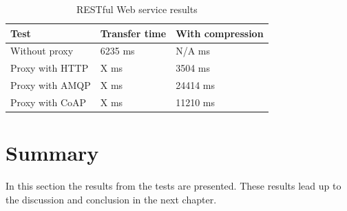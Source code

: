 \begin{table}[h!]
\begin{tabular}{| l | l | l |}
\hline
  \textbf{Test} & \textbf{Transfer time} & \textbf{With compression}\\ \hline
  Without proxy & 6235 ms & N/A ms \\ \hline
  Proxy with HTTP & X ms & 3504 ms \\ \hline
  Proxy with AMQP & X ms & 24414 ms \\ \hline
  Proxy with CoAP & X ms & 11210 ms \\ \hline
\end{tabular}
\caption{RESTful Web service results}
\end{table}

\section{Summary}

In this section the results from the tests are presented. These results lead up
to the discussion and conclusion in the next chapter.
